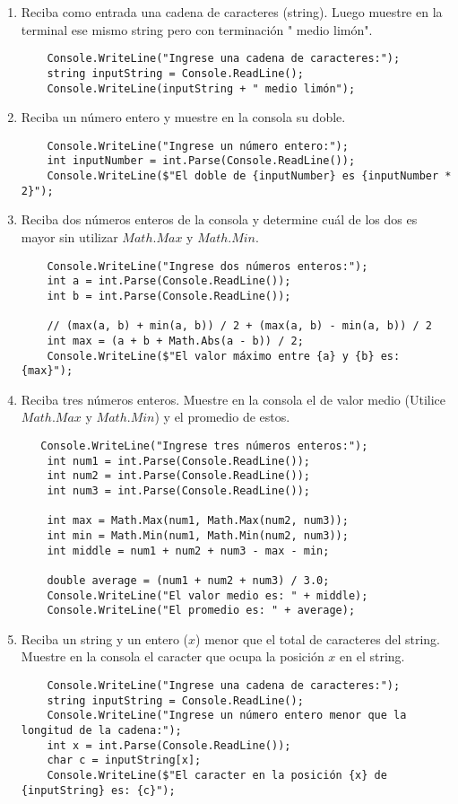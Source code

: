 \begin{enumerate}
	\item Reciba como entrada una cadena de caracteres (string).
        Luego muestre en la terminal ese mismo string pero con terminación " medio limón".
        \begin{lstlisting}
    Console.WriteLine("Ingrese una cadena de caracteres:");
    string inputString = Console.ReadLine();
    Console.WriteLine(inputString + " medio limón");
        \end{lstlisting}
	\item Reciba un número entero y muestre en la consola su doble.
        \begin{lstlisting}
    Console.WriteLine("Ingrese un número entero:");
    int inputNumber = int.Parse(Console.ReadLine());
    Console.WriteLine($"El doble de {inputNumber} es {inputNumber * 2}");
        \end{lstlisting}
        \item Reciba dos números enteros de la consola y determine cuál de los dos es mayor sin utilizar $Math.Max$ y $Math.Min$.
                \begin{lstlisting}
    Console.WriteLine("Ingrese dos números enteros:");
    int a = int.Parse(Console.ReadLine());
    int b = int.Parse(Console.ReadLine());
    
    // (max(a, b) + min(a, b)) / 2 + (max(a, b) - min(a, b)) / 2
    int max = (a + b + Math.Abs(a - b)) / 2;
    Console.WriteLine($"El valor máximo entre {a} y {b} es: {max}");
        \end{lstlisting}
	\item Reciba tres números enteros. Muestre en la consola el de valor medio (Utilice $Math.Max$ y $Math.Min$) y el promedio de estos.
        \begin{lstlisting}
   Console.WriteLine("Ingrese tres números enteros:");
    int num1 = int.Parse(Console.ReadLine());
    int num2 = int.Parse(Console.ReadLine());
    int num3 = int.Parse(Console.ReadLine());
    
    int max = Math.Max(num1, Math.Max(num2, num3));
    int min = Math.Min(num1, Math.Min(num2, num3));
    int middle = num1 + num2 + num3 - max - min;
    
    double average = (num1 + num2 + num3) / 3.0;
    Console.WriteLine("El valor medio es: " + middle);
    Console.WriteLine("El promedio es: " + average);
        \end{lstlisting}
	\item Reciba un string y un entero ($x$) menor que el total de caracteres del string. Muestre en la consola el caracter que ocupa la posición $x$ en el string.
         \begin{lstlisting}
    Console.WriteLine("Ingrese una cadena de caracteres:");
    string inputString = Console.ReadLine();
    Console.WriteLine("Ingrese un número entero menor que la longitud de la cadena:");
    int x = int.Parse(Console.ReadLine());
    char c = inputString[x];
    Console.WriteLine($"El caracter en la posición {x} de {inputString} es: {c}");
        \end{lstlisting}
\end{enumerate}
